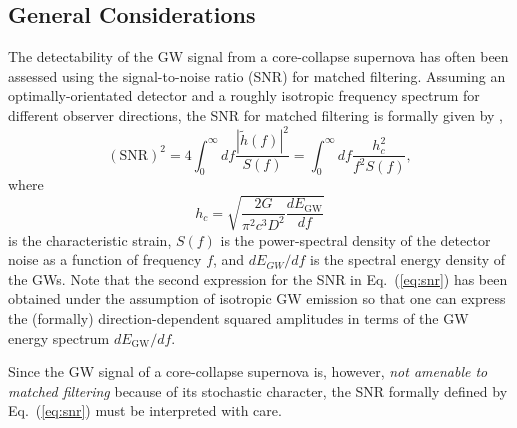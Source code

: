 \subsection{General Considerations}
The detectability of the GW signal from a core-collapse supernova has
often been assessed using the signal-to-noise ratio (SNR) for matched
filtering. Assuming an optimally-orientated detector and a roughly
isotropic frequency spectrum for different observer directions, the
SNR for matched filtering is formally given by \citep[][cp.\ their Eq.~(5.2) for the second form]{flanagan_98a},
\begin{equation}
\label{eq:snr}
(\mathrm{SNR})^2
=
4 \int_0^\infty df \frac{|\tilde{h}(f)|^2}{S(f)}
=
\int_0^{\infty} df \frac{h_c ^2}{f^2 S(f)},
\end{equation}
where
\begin{equation}
\label{eq:h_c}
h_c =\sqrt{ \frac{2 G}{\pi^2 c^3 D^2} \frac{d E_\mathrm{GW}}{df}}
\end{equation}
is the characteristic strain, $S(f)$ is the power-spectral density of the detector noise as a
function of frequency $f$, and $d E_{GW}/df$ is the spectral energy density of the GWs.
Note that the second expression for the SNR in Eq.~(\ref{eq:snr})
has been obtained under the assumption of isotropic GW emission so that
one can express the (formally) direction-dependent squared
amplitudes in terms of the GW energy spectrum $d E_\mathrm{GW}/df$.

Since the GW signal of a core-collapse supernova is,
however, \emph{not amenable to matched filtering} because of its
stochastic character, the SNR formally defined by
Eq.~(\ref{eq:snr}) must be interpreted with care. 

